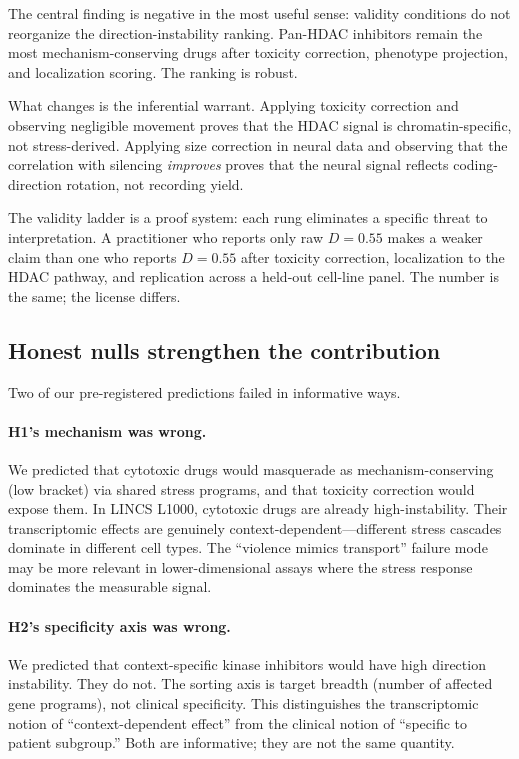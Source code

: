 \documentclass{article}
\begin{document}
The central finding is negative in the most useful sense: validity conditions
do not reorganize the direction-instability ranking. Pan-HDAC inhibitors
remain the most mechanism-conserving drugs after toxicity correction,
phenotype projection, and localization scoring. The ranking is robust.

What changes is the inferential warrant. Applying toxicity correction and
observing negligible movement proves that the HDAC signal is chromatin-specific,
not stress-derived. Applying size correction in neural data and observing
that the correlation with silencing \emph{improves} proves that the neural
signal reflects coding-direction rotation, not recording yield.

The validity ladder is a proof system: each rung eliminates a specific threat
to interpretation. A practitioner who reports only raw $D = 0.55$ makes a
weaker claim than one who reports $D = 0.55$ after toxicity correction,
localization to the HDAC pathway, and replication across a held-out cell-line
panel. The number is the same; the license differs.

\subsection{Honest nulls strengthen the contribution}

Two of our pre-registered predictions failed in informative ways.

\paragraph{H1's mechanism was wrong.}
We predicted that cytotoxic drugs would masquerade as mechanism-conserving
(low bracket) via shared stress programs, and that toxicity correction would
expose them. In LINCS L1000, cytotoxic drugs are already high-instability.
Their transcriptomic effects are genuinely context-dependent---different stress
cascades dominate in different cell types. The ``violence mimics transport''
failure mode may be more relevant in lower-dimensional assays where the stress
response dominates the measurable signal.

\paragraph{H2's specificity axis was wrong.}
We predicted that context-specific kinase inhibitors would have high direction
instability. They do not. The sorting axis is target breadth (number of
affected gene programs), not clinical specificity. This distinguishes the
transcriptomic notion of ``context-dependent effect'' from the clinical notion
of ``specific to patient subgroup.'' Both are informative; they are not the
same quantity.
\end{document}
